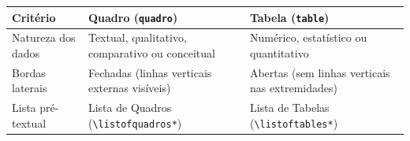 \begin{quadro}[!htbp]
    \centering
    \caption{Distinção normativa entre Quadro e Tabela segundo a ABNT e o IBGE}
    \begin{tabularx}{\textwidth}{|l|X|X|}
        \hline
        \textbf{Critério} & \textbf{Quadro (\texttt{quadro})} & \textbf{Tabela (\texttt{table})} \\
        \hline
        Natureza dos dados & Textual, qualitativo, comparativo ou conceitual & Numérico, estatístico ou quantitativo \\
        \hline
        Bordas laterais & Fechadas (linhas verticais externas visíveis) & Abertas (sem linhas verticais nas extremidades) \\
        \hline
        Lista pré-textual & Lista de Quadros (\texttt{\textbackslash listofquadros*}) & Lista de Tabelas (\texttt{\textbackslash listoftables*}) \\
        \hline
    \end{tabularx}
    \label{quadro:diferenca-quadro-tabela}
\end{quadro}
